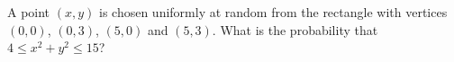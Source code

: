 A point $(x,y)$ is chosen uniformly at random from the rectangle with vertices $(0,0)$, $(0,3)$, $(5,0)$ and $(5,3)$. What is the probability that $4\le x^2+y^2\le15$?
